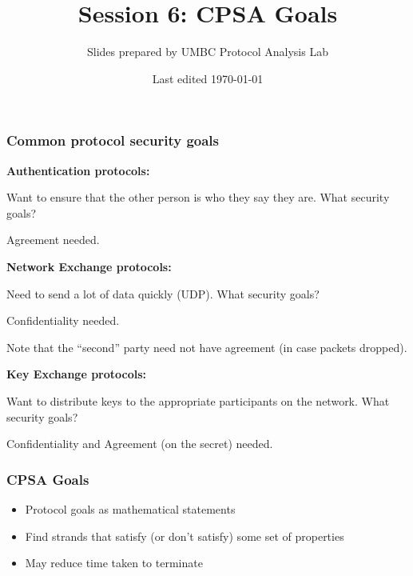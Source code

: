 \documentclass[red]{beamer}
\begin{document}

\title{Session 6: CPSA Goals}
\author{Slides prepared by UMBC Protocol Analysis Lab}
\date{Last edited \today}
\begin{frame}
\maketitle
\end{frame}



\begin{frame}\frametitle{Common protocol security goals}
\pause
\textbf{Authentication protocols:}
\pause

Want to ensure that the other person is who they say they are.
What security goals?
\pause

Agreement needed.

\pause
\textbf{Network Exchange protocols:}
\pause

Need to send a lot of data quickly (UDP).
What security goals?
\pause

Confidentiality needed.

Note that the ``second'' party need not have agreement (in case packets dropped).

\pause
\textbf{Key Exchange protocols:}
\pause

Want to distribute keys to the appropriate participants on the network.
What security goals?
\pause

Confidentiality and Agreement (on the secret) needed.


\end{frame}


\begin{frame}\frametitle{CPSA Goals}
\begin{itemize}
\item Protocol goals as mathematical statements
\item Find strands that satisfy (or don't satisfy) some set of properties
\item May reduce time taken to terminate
\end{itemize}
\end{frame}
\end{document}
